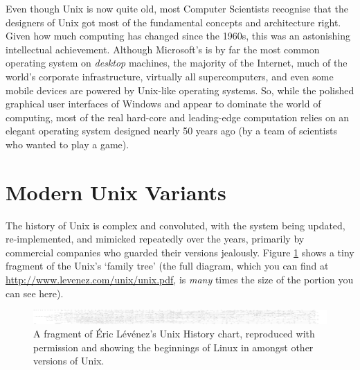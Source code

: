 Even though Unix is now quite old, most Computer Scientists recognise that the designers of Unix got most of the fundamental concepts and
architecture right. Given how much computing has changed since the 1960s, this was an astonishing intellectual achievement. Although Microsoft's  is by far the most common operating system on \emph{desktop} machines, the majority of the Internet, much of the world's corporate infrastructure, virtually all supercomputers, and even some mobile devices are powered by Unix-like operating systems. So, while the polished graphical user interfaces of Windows and  appear to dominate the world of computing, most of the real hard-core and leading-edge computation relies on an elegant operating system designed nearly 50 years ago (by a team of scientists who wanted to play a game).  

\section{Modern Unix Variants}
\label{sec:modern-unix-variants}


The history of Unix is complex and convoluted, with the system being updated, re-implemented, and mimicked repeatedly over the years, primarily by commercial companies who guarded their versions jealously. Figure \ref{fig:unix-history} shows a tiny fragment of the Unix's `family tree' (the full diagram, which you can find at \url{http://www.levenez.com/unix/unix.pdf}, is \emph{many} times the size of the portion you can see here).

\begin{figure}[h!tb]
  \begin{center}
    \includegraphics[width=13cm]{images/unix}
  \end{center}
\caption{A fragment of \'{E}ric L\'{e}v\'{e}nez's Unix History chart, reproduced with permission and showing the beginnings of Linux in amongst other versions of Unix.}
\label{fig:unix-history}
\end{figure}
 
